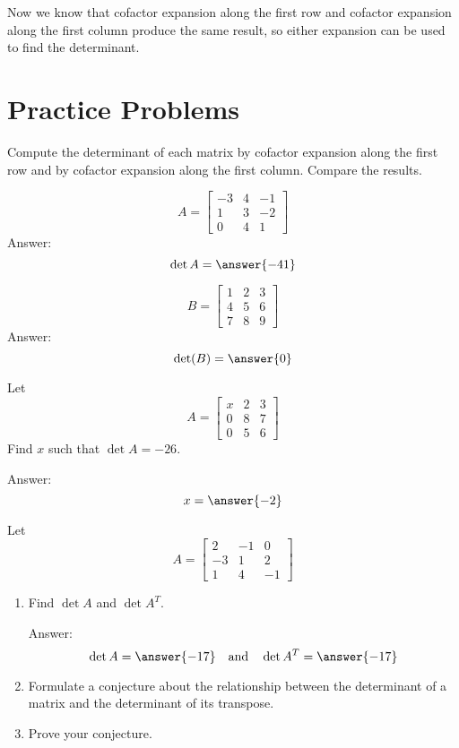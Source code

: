 \documentclass{ximera}
\begin{document}
Now we know that cofactor expansion along the first row and cofactor expansion along the first column produce the same result, so either expansion can be used to find the determinant.  

\section*{Practice Problems}

\begin{problem} Compute the determinant of each matrix by cofactor expansion along the first row and by cofactor expansion along the first column.  Compare the results.
\begin{problem}
$$A=\begin{bmatrix}-3&4&-1\\1&3&-2\\0&4&1\end{bmatrix}$$
Answer:
$$\det{A}=\answer{-41}$$
\end{problem}

\begin{problem}
$$B=\begin{bmatrix}1&2&3\\4&5&6\\7&8&9\end{bmatrix}$$
Answer:
$$\text{det}(B)=\answer{0}$$
\end{problem}
\end{problem}

\begin{problem} Let 
$$A=\begin{bmatrix}x&2&3\\0&8&7\\0&5&6\end{bmatrix}$$
Find $x$ such that $\det{A}=-26$.

Answer: $$x=\answer{-2}$$
\end{problem}

\begin{problem}\label{prob:dettranspose}
Let $$A=\begin{bmatrix}2&-1&0\\-3&1&2\\1&4&-1\end{bmatrix}$$
\begin{enumerate}
\item
Find $\det{A}$ and $\det{A^T}$.

Answer:
$$\det{A}=\answer{-17}\quad\text{and}\quad\det{A^T}=\answer{-17}$$
\item Formulate a conjecture about the relationship between the determinant of a matrix and the determinant of its transpose.
\item Prove your conjecture.
\end{enumerate}
\end{problem}
\end{document}
